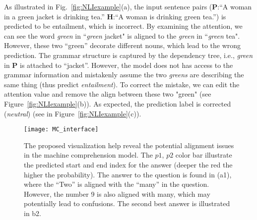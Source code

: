 As illustrated in Fig.~\ref{fig:NLIexample}(a), the input sentence pairs (\textbf{P}:``A woman in a green jacket is drinking tea.'' \textbf{H}:``A woman is drinking green tea.'') is predicted to be entailment, which is incorrect.
By examining the attention, we can see the word \emph{green} in ``\emph{green} jacket" is aligned to the \emph{green} in ``\emph{green} tea". However, these two ``green'' decorate different nouns, which lead to the wrong prediction. The grammar structure is captured by the dependency tree, i.e., \emph{green} in \textbf{P} is attached to ``jacket''. However, the model does not has access to the grammar information and mistakenly assume the two \emph{greens} are describing the same thing (thus predict \emph{entailment}). 
%
To correct the mistake, we can edit the attention value and remove the align between these two "green" (see Figure~\ref{fig:NLIexample}(b)).
As expected, the prediction label is corrected (\emph{neutral}) (see in Figure~\ref{fig:NLIexample}(c)).

\begin{figure*}[t]
\centering
\vspace{-2mm}
 \texttt{[image: MC\_interface]}
  \vspace{-6mm}
 \caption{
The proposed visualization help reveal the potential alignment issues in the machine comprehension model.
The $p1$, $p2$ color bar illustrate the predicted start and end index for the answer (deeper the red the higher the probability).
The answer to the question is found in (a1), where the ``Two'' is aligned with the ``many'' in the question. However, the number 9 is also aligned with many, which may potentially lead to confusions.
The second best answer is illustrated in b2.
}
\label{fig:MCexample}
\end{figure*}

